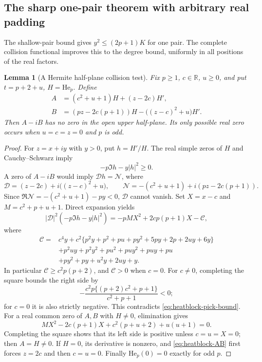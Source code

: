 \documentclass[11pt]{article}
\newtheorem{lemma}[theorem]{Lemma}
\theoremstyle{definition}
\theoremstyle{remark}
\newcommand{\R}{\mathbb R}
\begin{document}
\subsection{The sharp one-pair theorem with arbitrary real padding}

The shallow-pair bound gives $y^2\le(2p+1)K$ for one pair.  The complete
collision functional improves this to the degree bound, uniformly in
all positions of the real factors.

\begin{lemma}[A Hermite half-plane collision test]
\label{lem:heatblock-onepair-stability}
Fix $p\ge1$, $c\in\R$, $u\ge0$, and put $t=p+2+u$,
$H=\mathrm{He}_p$.  Define
\begin{equation}
 \begin{split}
 A&=(c^2+u+1)H+(z-2c)H',\\
 B&=(pz-2c(p+1))H-\bigl((z-c)^2+u\bigr)H'.
 \end{split}
 \label{eq:heatblock-AB}
\end{equation}
Then $A-iB$ has no zero in the open upper half-plane.  Its only
possible real zero occurs when $u=c=z=0$ and $p$ is odd.
\end{lemma}

\begin{proof}
For $z=x+iy$ with $y>0$, put $h=H'/H$.
The real simple zeros of $H$ and Cauchy--Schwarz imply
\begin{equation}
 -p\Im h-y|h|^2\ge0.
 \label{eq:heatblock-pick-bound}
\end{equation}
A zero of $A-iB$ would imply $\mathcal D h=\mathcal N$, where
\[
 \mathcal D=(z-2c)+i\bigl((z-c)^2+u\bigr),\qquad
 \mathcal N=-(c^2+u+1)+i(pz-2c(p+1)).
\]
Since $\Re\mathcal N=-(c^2+u+1)-py<0$, $\mathcal D$ cannot vanish.
Set $X=x-c$ and $M=c^2+p+u+1$.  Direct expansion yields
\begin{equation}
 |\mathcal D|^2(-p\Im h-y|h|^2)
 =-pMX^2+2cp(p+1)X-\mathcal C,
 \label{eq:heatblock-pick-contradiction}
\end{equation}
where
\begin{align*}
 \mathcal C={}&c^4y
 +c^2\{p^2y+p^2+pu+py^2+5py+2p+2uy+6y\}\\
 &+p^2uy+p^2y^2+pu^2+puy^2+puy+pu\\
 &+py^2+py+u^2y+2uy+y.
\end{align*}
In particular $\mathcal C\ge c^2p(p+2)$, and $\mathcal C>0$ when
$c=0$.  For $c\ne0$, completing the square bounds the right side by
\[
 -\frac{c^2p\{(p+2)c^2+p+1\}}{c^2+p+1}<0;
\]
for $c=0$ it is also strictly negative.  This contradicts
\eqref{eq:heatblock-pick-bound}.
For a real common zero of $A,B$ with $H\ne0$, elimination gives
\[
 MX^2-2c(p+1)X+c^2(p+u+2)+u(u+1)=0.
\]
Completing the square shows that its left side is positive unless
$c=u=X=0$; then $A=H\ne0$.  If $H=0$, its derivative is nonzero,
and \eqref{eq:heatblock-AB} first forces $z=2c$ and then $c=u=0$.
Finally $\mathrm{He}_p(0)=0$ exactly for odd $p$.
\end{proof}
\end{document}
